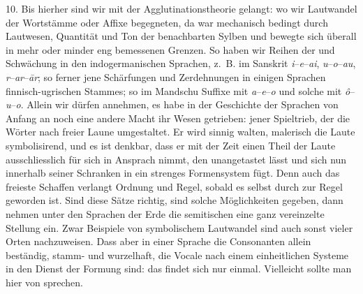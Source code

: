 \label{IV.III.II.4.10}10. Bis hierher sind wir mit der Agglutinationstheorie gelangt: wo wir  Lautwandel der Wortstämme oder Affixe begegneten, da war  mechanisch bedingt durch Lautwesen, Quantität und Ton der benachbarten Sylben und bewegte sich überall in mehr oder minder eng bemessenen Grenzen. So haben wir Reihen der  und Schwächung in den indogermanischen Sprachen, z.~B. im Sanskrit \textit{i}–\textit{e}–\textit{ai}, \textit{u}–\textit{o}–\textit{au}, \textit{r}–\textit{ar}–\textit{ār}; so ferner jene Schärfungen und Zerdehnungen in einigen Sprachen  finnisch-ugrischen Stammes; so im Mandschu Suffixe mit \textit{a}–\textit{e}–\textit{o} und solche mit \textit{ô}–\textit{u}–\textit{o}. Allein \label{sp.353} wir dürfen annehmen, es habe in der Geschichte der Sprachen von Anfang an noch eine andere Macht ihr Wesen getrieben: jener Spieltrieb, der die Wörter nach freier Laune umgestaltet. Er wird sinnig walten, malerisch die Laute symbolisirend, und es ist denkbar, dass er mit der Zeit einen Theil der Laute aus\label{fp.335}schliesslich für sich in Ansprach nimmt, den  unangetastet lässt und sich nun innerhalb seiner Schranken in ein strenges Formensystem fügt. Denn auch das freieste Schaffen verlangt Ordnung und Regel, sobald es selbst durch  zur Regel geworden ist. Sind diese Sätze richtig, sind solche Möglichkeiten gegeben, dann nehmen unter den Sprachen der Erde die semitischen eine ganz vereinzelte Stellung ein. Zwar Beispiele von symbolischem Lautwandel sind auch sonst vieler Orten nachzuweisen. Dass aber in einer Sprache die Consonanten allein beständig, stamm- und wurzelhaft, die Vocale nach einem einheitlichen Systeme in den \label{fp.204} Dienst der Formung  sind: das findet sich nur einmal. Vielleicht sollte man hier von  sprechen.

